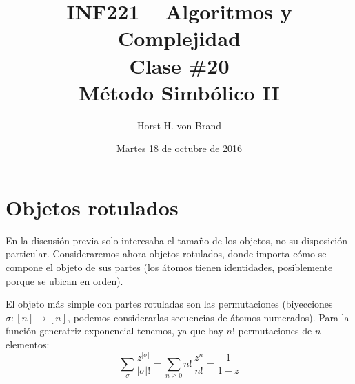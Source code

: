 \documentclass[english, spanish, fleqn, 10pt]{article}
\author{
	Horst H. von Brand}
\title{INF221 -- Algoritmos y Complejidad\\[.4\baselineskip]
	Clase \#20\\
	Método Simbólico II}
\date{Martes 18 de octubre de 2016}
\numberwithin{equation}{section}
\theoremstyle{definition}
\begin{document}
\maketitle

\section{Objetos rotulados}
\label{sec:objetos-rotulados}

En la discusión previa solo interesaba el tamaño de los objetos,
no su disposición particular.
Consideraremos ahora objetos rotulados,
donde importa cómo se compone el objeto de sus partes
(los átomos tienen identidades,
posiblemente porque se ubican en orden).

El objeto más simple con partes rotuladas son las permutaciones
(biyecciones \(\sigma \colon [n] \rightarrow [n]\),
podemos considerarlas secuencias de átomos numerados).
Para la función generatriz exponencial tenemos,
ya que hay \(n!\) permutaciones de \(n\) elementos:
\begin{equation*}
\sum_{\sigma}
\frac{z^{\lvert \sigma \rvert}}{\lvert \sigma \rvert !}
= \sum_{n \ge 0} n! \, \frac{z^n}{n!}
= \frac{1}{1 - z}
\end{equation*}
\end{document}
